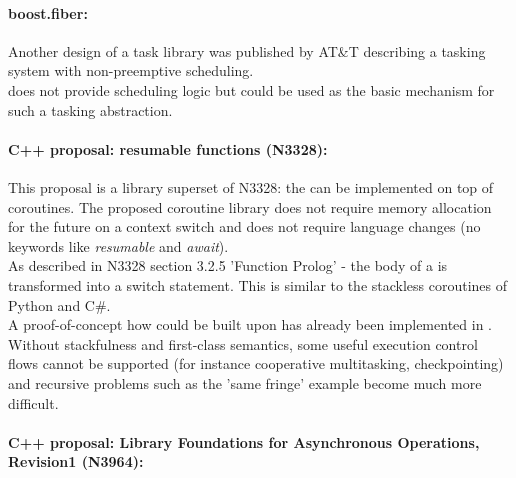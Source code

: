 \paragraph*{boost.fiber:}
Another design of a task library was published by AT\&T\cite{atnt1989}
describing a tasking system with non-preemptive scheduling.\\
\scoro does not provide scheduling logic but could be used as the
basic mechanism for such a tasking abstraction.

\paragraph*{C++ proposal: resumable functions (N3328\cite{n3328}):}
This proposal is a library superset of N3328: the \resumfn can be implemented
on top of coroutines. The proposed coroutine library does not require memory allocation
for the future on a context switch and does not require language changes (no keywords
like \textit{resumable} and \textit{await}).\\
As described in N3328 section 3.2.5 'Function Prolog' - the body of a \resumfn is
transformed into a switch statement. This is similar to the stackless coroutines
of Python and C\#.\\
A proof-of-concept how \await could be built upon \boostcoroutine has already been
implemented in \awaitemu.\\
\newline
Without stackfulness and first-class semantics, some useful execution control
flows cannot be supported (for instance cooperative multitasking,
checkpointing) and recursive problems such as the 'same fringe' example become
much more difficult.

\paragraph*{C++ proposal: Library Foundations for Asynchronous Operations, Revision1
(N3964\cite{n3964}):}

